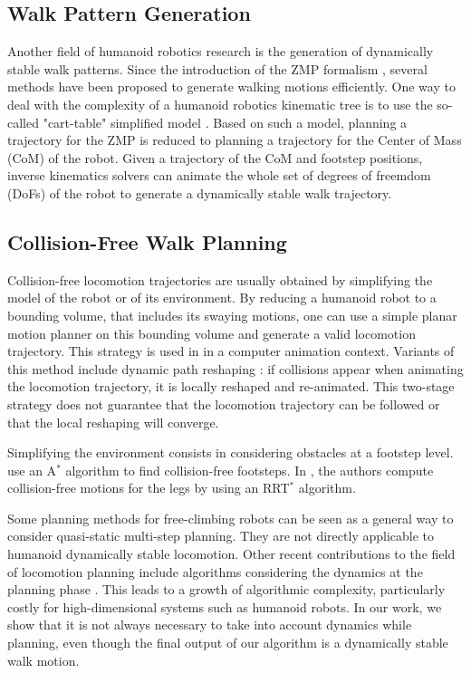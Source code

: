 \documentclass{article}
\begin{document}
\subsection{Walk Pattern Generation}

Another  field of  humanoid  robotics research  is  the generation  of
dynamically stable  walk patterns. Since  the introduction of  the ZMP
formalism  \cite{vukobratovic1969contribution},  several  methods  have  been  proposed  to
generate  walking  motions efficiently.   One  way  to  deal with  the
complexity  of a  humanoid  robotics  kinematic tree  is  to use  the
so-called "cart-table" simplified model \cite{kajita2003biped}. Based on such a
model,  planning a trajectory  for the  ZMP is  reduced to  planning a
trajectory  for  the Center  of  Mass (CoM)  of  the  robot.  Given  a
trajectory  of  the CoM  and  footstep  positions, inverse  kinematics
solvers can animate  the whole set of degrees of freemdom (DoFs) of the  
robot to generate a dynamically stable walk trajectory.


\subsection{Collision-Free Walk Planning}

Collision-free  locomotion   trajectories  are  usually   obtained  by
simplifying the model of the  robot or of its environment. By reducing 
a  humanoid robot to a bounding volume, that includes its swaying motions,
one can  use a simple  planar motion planner  on this bounding  volume and
generate  a valid  locomotion  trajectory. This  strategy  is used  in
\cite{pettre20032} in a computer animation context. Variants of this method
include  dynamic path reshaping  \cite{yoshida-humanoids05}: if  collisions appear
when animating  the locomotion  trajectory, it is  locally reshaped
and re-animated.  This two-stage  strategy does not guarantee that the
locomotion trajectory can be followed or that the local reshaping will
converge.

Simplifying  the environment  consists in  considering obstacles  at a
footstep   level.   \cite{chestnutt2005footstep,kuffner2005motion}
use   an  
A$^{*}$   algorithm  to   find
collision-free   footsteps.    In   \cite{perrinbiped},   the   authors   compute
collision-free motions  for the legs by using  an RRT$^{*}$ algorithm. 

Some planning methods for free-climbing robots \cite{bretl2006motion}
can be seen as a general way 
to consider quasi-static multi-step planning. They are not directly applicable to
humanoid dynamically stable locomotion.
Other recent contributions to the field of locomotion planning  include algorithms 
considering the dynamics at the planning phase \cite{shkolnik2011bounding}. This leads to 
a growth of algorithmic complexity, particularly costly for high-dimensional
systems such as humanoid robots. In our work, we show that it is not always
necessary to take into account dynamics while planning, even though the final
output of our algorithm is a dynamically stable walk motion.
\end{document}
